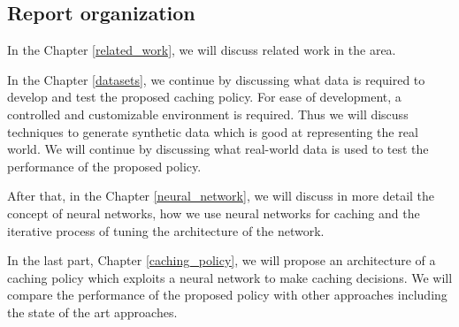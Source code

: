 \subsection{Report organization} \label{report_organization}

In the Chapter \ref{related_work}, we will discuss related work in the area.

In the Chapter \ref{datasets}, we continue by discussing what data is required to develop and test the proposed caching policy. For ease of development, a controlled and customizable environment is required. Thus we will discuss techniques to generate synthetic data which is good at representing the real world. We will continue by discussing what real-world data is used to test the performance of the proposed policy.

After that, in the Chapter \ref{neural_network}, we will discuss in more detail the concept of neural networks, how we use neural networks for caching and the iterative process of tuning the architecture of the network.

In the last part, Chapter \ref{caching_policy}, we will propose an architecture of a caching policy which exploits a neural network to make caching decisions. We will compare the performance of the proposed policy with other approaches including the state of the art approaches.



